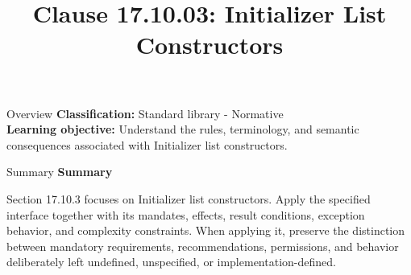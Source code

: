 \documentclass[10pt,letterpaper]{article}
\title{Clause 17.10.03: Initializer List Constructors}
\author{}
\date{}
\begin{document}
\maketitle
\begin{CornellOverviewBox}{Overview}
\textbf{Classification:} Standard library - Normative\\[2pt]
\textbf{Learning objective:} Understand the rules, terminology, and semantic consequences associated with Initializer list constructors.
\end{CornellOverviewBox}\begin{CornellSummaryBox}{Summary}
{\sffamily\bfseries\color{Accent} Summary}\par\vspace{3pt}Section 17.10.3 focuses on Initializer list constructors. Apply the specified interface together with its mandates, effects, result conditions, exception behavior, and complexity constraints. When applying it, preserve the distinction between mandatory requirements, recommendations, permissions, and behavior deliberately left undefined, unspecified, or implementation-defined.
\end{CornellSummaryBox}
\end{document}
